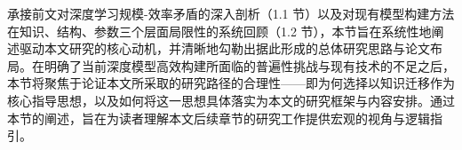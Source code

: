 \documentclass[../main.tex]{subfiles}
\begin{document}

\label{sec:research-motivation-and-overall-approach}

承接前文对深度学习规模-效率矛盾的深入剖析（1.1 节）以及对现有模型构建方法在知识、结构、参数三个层面局限性的系统回顾（1.2 节），本节旨在系统性地阐述驱动本文研究的核心动机，并清晰地勾勒出据此形成的总体研究思路与论文布局。在明确了当前深度模型高效构建所面临的普遍性挑战与现有技术的不足之后，本节将聚焦于论证本文所采取的研究路径的合理性——即为何选择以知识迁移作为核心指导思想，以及如何将这一思想具体落实为本文的研究框架与内容安排。通过本节的阐述，旨在为读者理解本文后续章节的研究工作提供宏观的视角与逻辑指引。
\end{document}
